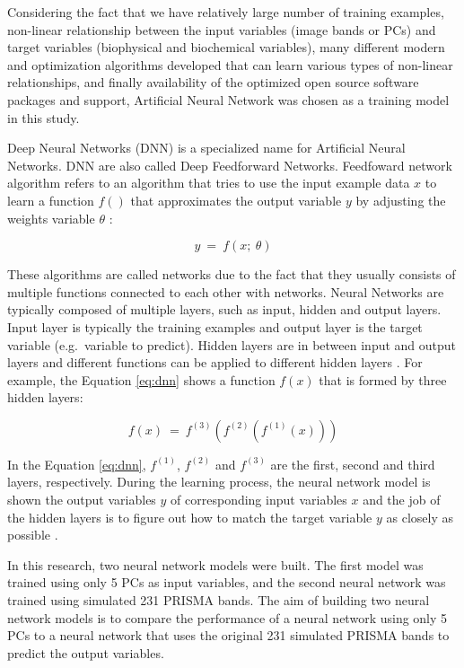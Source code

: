 \documentclass[a4paper, twoside]{templates/ociamthesis}
\begin{document}
Considering the fact that we have relatively large number of training examples, non-linear relationship between the input variables (image bands or PCs) and target variables (biophysical and biochemical variables), many different modern and optimization algorithms developed that can learn various types of non-linear relationships, and finally availability of the optimized open source software packages and support, Artificial Neural Network was chosen as a training model in this study.

Deep Neural Networks (DNN) is a specialized name for Artificial Neural Networks. DNN are also called Deep Feedforward Networks. Feedfoward network algorithm refers to an algorithm that tries to use the input example data \(x\) to learn a function \(f()\) that approximates the output variable \(y\) by adjusting the weights variable \(\theta\) \citep{goodfellow2016deep}:

\begin{equation}
y\ =\ f\left(x;\ \theta\right)
\label{eq:feed}
\end{equation}

These algorithms are called networks due to the fact that they usually consists of multiple functions connected to each other with networks. Neural Networks are typically composed of multiple layers, such as input, hidden and output layers. Input layer is typically the training examples and output layer is the target variable (e.g.~variable to predict). Hidden layers are in between input and output layers and different functions can be applied to different hidden layers \citep{goodfellow2016deep}. For example, the Equation \eqref{eq:dnn} shows a function \(f(x)\) that is formed by three hidden layers:

\begin{equation}
f\left(x\right)\ =\ f^{\left(3\right)}\left(f^{\left(2\right)}\left(f^{\left(1\right)}\left(x\right)\right)\right)
\label{eq:dnn}
\end{equation}

In the Equation \eqref{eq:dnn}, \(f^{(1)}\), \(f^{(2)}\) and \(f^{(3)}\) are the first, second and third layers, respectively. During the learning process, the neural network model is shown the output variables \(y\) of corresponding input variables \(x\) and the job of the hidden layers is to figure out how to match the target variable \(y\) as closely as possible \citep{goodfellow2016deep}.

In this research, two neural network models were built. The first model was trained using only 5 PCs as input variables, and the second neural network was trained using simulated 231 PRISMA bands. The aim of building two neural network models is to compare the performance of a neural network using only 5 PCs to a neural network that uses the original 231 simulated PRISMA bands to predict the output variables.
\end{document}
